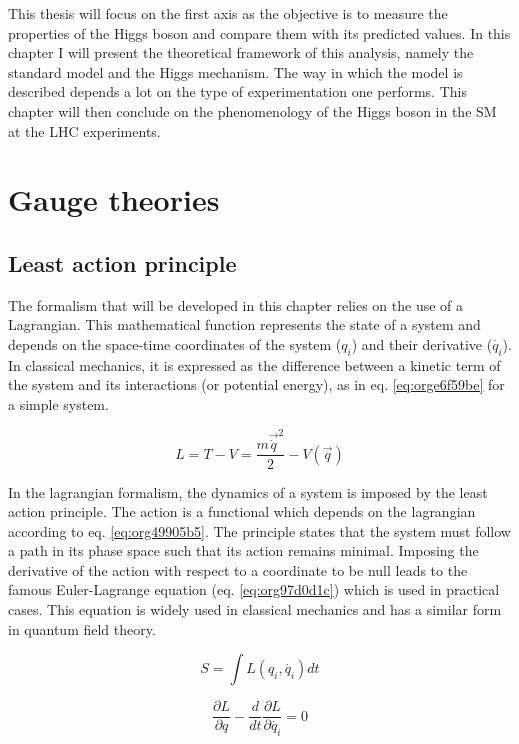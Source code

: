 This thesis will focus on the first axis as the objective is to measure the properties of the Higgs boson and compare them with its predicted values.
In this chapter I will present the theoretical framework of this analysis, namely the standard model and the Higgs mechanism.
The way in which the model is described depends a lot on the type of experimentation one performs.
This chapter will then conclude on the phenomenology of the Higgs boson in the SM at the LHC experiments.


\section{Gauge theories}
\label{sec:org5fbff7e}
\subsection{Least action principle}
\label{sec:org24ae533}

The formalism that will be developed in this chapter relies on the use of a Lagrangian.
This mathematical function represents the state of a system and depends on the space-time coordinates of the system (\(q_i\)) and their derivative (\(\dot{q_i}\)).
In classical mechanics, it is expressed as the difference between a kinetic term of the system and its interactions (or potential energy), as in eq. \ref{eq:orge6f59be} for a simple system.

\begin{equation}
\label{eq:orge6f59be}
L=T-V = \frac{m\vec{\dot{q}}^2}{2}-V(\vec{q})
\end{equation}

In the lagrangian formalism, the dynamics of a system is imposed by the least action principle.
The action is a functional which depends on the lagrangian according to eq. \ref{eq:org49905b5}.
The principle states that the system must follow a path in its phase space such that its action remains minimal.
Imposing the derivative of the action with respect to a coordinate to be null leads to the famous Euler-Lagrange equation (eq. \ref{eq:org97d0d1c}) which is used in practical cases.
This equation is widely used in classical mechanics and has a similar form in quantum field theory.

\begin{equation}
\label{eq:org49905b5}
S=\int L( q_i, \dot{q_i}) dt
\end{equation}

\begin{equation}
\label{eq:org97d0d1c}
\frac{\partial L}{\partial q} - \frac{d}{dt}\frac{\partial L}{\partial \dot{q_i}}=0
\end{equation}



